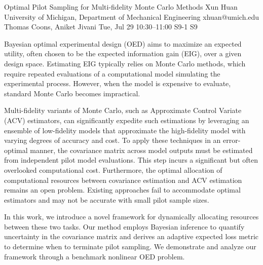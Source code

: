 \documentclass[12pt,lettersize,oneside]{book} %
\begin{document}
\begin{talk}
  {Optimal Pilot Sampling for Multi-fidelity Monte Carlo Methods}%
  {Xun Huan}%
  {University of Michigan, Department of Mechanical Engineering}%
  {xhuan@umich.edu}%
  {Thomas Coons, Aniket Jivani}%
  {}%
  {Tue, Jul 29 10:30--11:00}%
  {S9-1}%
  {S9}%
  
    

Bayesian optimal experimental design (OED) aims to maximize an expected utility, often chosen to be the expected information gain (EIG), over a given design space. Estimating EIG typically relies on Monte Carlo methods, which require repeated evaluations of a computational model simulating the experimental process. 
However, when the model is expensive to evaluate, standard Monte Carlo becomes impractical.

Multi-fidelity variants of Monte Carlo, such as Approximate Control Variate (ACV) estimators, can significantly expedite such estimations by leveraging an ensemble of low-fidelity models that approximate the high-fidelity model with varying degrees of accuracy and cost. 
To apply these techniques in an error-optimal manner, the covariance matrix across model outputs must be estimated from independent pilot model evaluations. This step incurs a significant but often overlooked computational cost. 
Furthermore, the optimal allocation of computational resources between 
covariance estimation and 
ACV estimation remains an open problem.  Existing approaches fail to accommodate optimal estimators and may not be accurate with small pilot sample sizes.

In this work, we introduce a novel framework for dynamically allocating resources between these two tasks.
Our method employs Bayesian inference
to quantify uncertainty in the covariance matrix and derives an adaptive expected loss metric
to determine when to terminate pilot sampling. 
We demonstrate and analyze our framework through a benchmark nonlinear OED problem. 


\end{talk}
\end{document}
